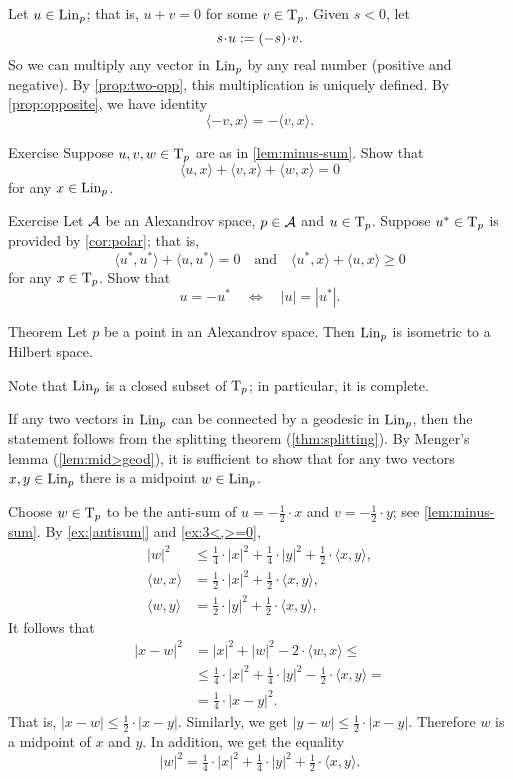 Let $u\in \mathop{\rm Lin}\nolimits_p$; that is, $u+v=0$ for some $v\in\mathrm{T}_p$.
Given $s<0$, let 
\[s\cdot u\df (-s)\cdot v.\]
So we can multiply any vector in $\mathop{\rm Lin}\nolimits_p$ by any real number (positive and negative).
By \ref{prop:two-opp}, this multiplication is uniquely defined.
By \ref{prop:opposite}, we have identity
\[\langle -v,x\rangle=-\langle v,x\rangle.\]


\begin{thm}{Exercise}\label{ex:3<,>=0}
Suppose $u,v,w\in\mathrm{T}_p$ are as in \ref{lem:minus-sum}.
Show that
\[\langle u,x\rangle +\langle v,x\rangle +\langle w,x\rangle = 0\]
for any $x\in \mathop{\rm Lin}\nolimits_p$.
\end{thm}

\begin{thm}{Exercise}\label{ex:-u}
Let $\mathcal{A}$ be an Alexandrov space,
$p\in \mathcal{A}$ and $u\in \mathrm{T}_p$.
Suppose $u^*\in \mathrm{T}_p$ is provided by \ref{cor:polar};
that is, 
\[\langle u^*,u^*\rangle +\langle u,u^*\rangle = 0
\quad\text{and}\quad
\langle u^*,x\rangle +\langle u,x\rangle \ge 0
\]
for any $x\in \mathrm{T}_p$.
Show that 
\[u=-u^*\quad\Longleftrightarrow\quad|u|=|u^*|.\]
\end{thm}

\begin{thm}{Theorem}\label{thm:lin-subcone}
Let $p$ be a point in an Alexandrov space. 
Then $\mathop{\rm Lin}\nolimits_p$ is isometric to a Hilbert space.
\end{thm}

Note that $\mathop{\rm Lin}\nolimits_p$ is a closed subset of $\mathrm{T}_p$;
in particular, it is complete.

If any two vectors in $\mathop{\rm Lin}\nolimits_p$ can be connected by a geodesic in $\mathop{\rm Lin}\nolimits_p$,
then the statement follows from the splitting theorem (\ref{thm:splitting}).
By Menger's lemma (\ref{lem:mid>geod}), it is sufficient to show that for any two vectors $x,y\in\mathop{\rm Lin}\nolimits_p$
there is a midpoint $w\in \mathop{\rm Lin}\nolimits_p$.

Choose $w\in \mathrm{T}_p$ to be the anti-sum of $u=-\tfrac{1}{2}\cdot x$ and $v=-\tfrac{1}{2}\cdot y$;
see \ref{lem:minus-sum}.
By \ref{ex:|antisum|} and \ref{ex:3<,>=0},
\begin{align*}
|w|^2&\le \tfrac14\cdot |x|^2+\tfrac14\cdot|y|^2+\tfrac12\cdot\langle x,y\rangle,
\\
\langle w,x\rangle&= \tfrac12\cdot|x|^2+\tfrac12\cdot\langle x,y\rangle,
\\
\langle w,y\rangle&= \tfrac12\cdot|y|^2+\tfrac12\cdot\langle x,y\rangle,
\end{align*}
It follows that 
\begin{align*}
|x-w|^2
&= |x|^2+|w|^2-2\cdot\langle w,x\rangle\le
\\
&\le \tfrac14\cdot |x|^2+\tfrac14\cdot|y|^2-\tfrac12\cdot\langle x,y\rangle=
\\
&=\tfrac14\cdot|x-y|^2.
\end{align*}
That is, $|x-w|\le \tfrac12\cdot|x-y|$.
Similarly, we get $|y-w|\le \tfrac12\cdot|x-y|$.
Therefore $w$ is a midpoint of $x$ and $y$.
In addition, we get the equality 
\[|w|^2= \tfrac14\cdot |x|^2+\tfrac14\cdot|y|^2+\tfrac12\cdot\langle x,y\rangle.\]

